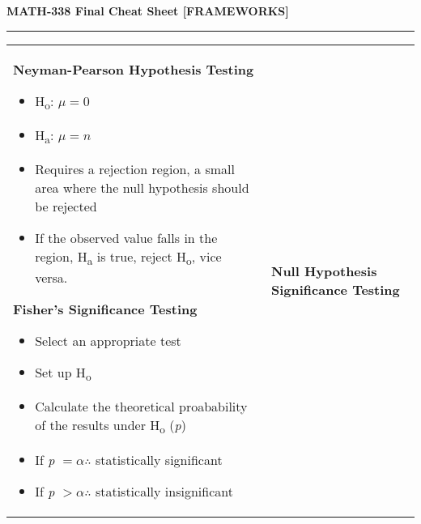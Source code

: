 \documentclass[6pt]{article}
\newcommand{\HL}{\par\noindent\rule{\textwidth}{0.4pt}}
\begin{document}
\begin{scriptsize}

\begin{center}
\textbf{MATH-338 Final Cheat Sheet [FRAMEWORKS]}
\end{center}

\HL

\begin{tabular}{l | l}

\parbox{0.45\textwidth}{

\begin{flushleft}
\textbf{Neyman-Pearson Hypothesis Testing}
\end{flushleft}

\begin{itemize}
\item H\textsubscript{o}: $\mu = 0$
\item H\textsubscript{a}: $\mu = n$
\item Requires a rejection region, a small area where the null hypothesis should be rejected
\item If the observed value falls in the region, H\textsubscript{a} is true, reject H\textsubscript{o}, vice versa.
\end{itemize}

\begin{flushleft}
\textbf{Fisher's Significance Testing}
\end{flushleft}

\begin{itemize}
\item Select an appropriate test
\item Set up H\textsubscript{o}
\item Calculate the theoretical proabability of the results under H\textsubscript{o} (\emph{p})
\item If \emph{p} $= \alpha \therefore$ statistically significant
\item If \emph{p} $> \alpha \therefore$ statistically insignificant
\end{itemize}

}

&

\parbox{0.5\textwidth}{
\begin{flushright}

\begin{flushleft}
\textbf{Null Hypothesis Significance Testing}
\end{flushleft}

\begin{itemize}



\end{itemize}
\end{flushright}}
\end{tabular}
\end{scriptsize}
\end{document}
